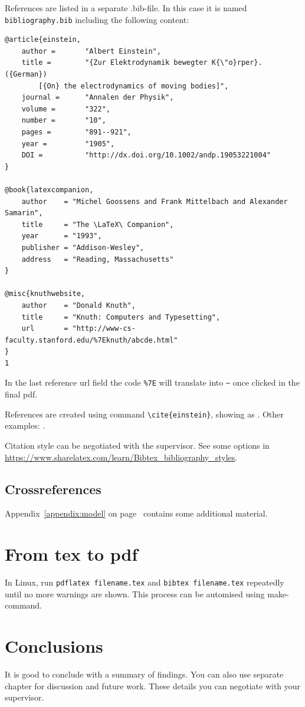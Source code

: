 References are listed in a separate .bib-file. In this case it is named \texttt{bibliography.bib} including the following content:
\begin{verbatim}
@article{einstein,
    author =       "Albert Einstein",
    title =        "{Zur Elektrodynamik bewegter K{\"o}rper}. ({German})
        [{On} the electrodynamics of moving bodies]",
    journal =      "Annalen der Physik",
    volume =       "322",
    number =       "10",
    pages =        "891--921",
    year =         "1905",
    DOI =          "http://dx.doi.org/10.1002/andp.19053221004"
}
 
@book{latexcompanion,
    author    = "Michel Goossens and Frank Mittelbach and Alexander Samarin",
    title     = "The \LaTeX\ Companion",
    year      = "1993",
    publisher = "Addison-Wesley",
    address   = "Reading, Massachusetts"
}
 
@misc{knuthwebsite,
    author    = "Donald Knuth",
    title     = "Knuth: Computers and Typesetting",
    url       = "http://www-cs-faculty.stanford.edu/%7Eknuth/abcde.html"
}
1
\end{verbatim}

In the last reference url field the code \verb+%7E+ will translate into \verb+~+ once clicked in the final pdf.

References are created using command \texttt{\textbackslash cite\{einstein\}}, showing as \citep{einstein}. Other examples: \citep{latexcompanion,knuthwebsite}.

Citation style can be negotiated with the supervisor. See some options in \url{https://www.sharelatex.com/learn/Bibtex_bibliography_styles}.

\section{Crossreferences}

Appendix~\ref{appendix:model} on page~\pageref{appendix:model} contains some additional material.

\chapter{From tex to pdf}

In Linux, run \texttt{pdflatex filename.tex} and \texttt{bibtex filename.tex} repeatedly until no more warnings are shown. This process can be automised using make-command.
 
\chapter{Conclusions\label{chapter:conclusions}}

It is good to conclude with a summary of findings. You can also use separate chapter for discussion and future work. These details you can negotiate with your supervisor.